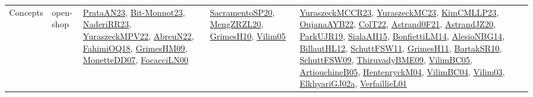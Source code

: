 {\begin{longtable}{lp{3cm}>{\raggedright}p{6cm}>{\raggedright}p{6cm}p{8cm}}
Concepts & open-shop & \href{articles/PrataAN23.pdf}{PrataAN23}\cite{PrataAN23}, \href{papers/Bit-Monnot23.pdf}{Bit-Monnot23}\cite{Bit-Monnot23}, \href{articles/NaderiRR23.pdf}{NaderiRR23}\cite{NaderiRR23}, \href{articles/YuraszeckMPV22.pdf}{YuraszeckMPV22}\cite{YuraszeckMPV22}, \href{articles/AbreuN22.pdf}{AbreuN22}\cite{AbreuN22}, \href{articles/FahimiOQ18.pdf}{FahimiOQ18}\cite{FahimiOQ18}, \href{papers/GrimesHM09.pdf}{GrimesHM09}\cite{GrimesHM09}, \href{papers/MonetteDD07.pdf}{MonetteDD07}\cite{MonetteDD07}, \href{papers/FocacciLN00.pdf}{FocacciLN00}\cite{FocacciLN00} & \href{articles/SacramentoSP20.pdf}{SacramentoSP20}\cite{SacramentoSP20}, \href{articles/MengZRZL20.pdf}{MengZRZL20}\cite{MengZRZL20}, \href{papers/GrimesH10.pdf}{GrimesH10}\cite{GrimesH10}, \href{papers/Vilim05.pdf}{Vilim05}\cite{Vilim05} & \href{articles/YuraszeckMCCR23.pdf}{YuraszeckMCCR23}\cite{YuraszeckMCCR23}, \href{papers/YuraszeckMC23.pdf}{YuraszeckMC23}\cite{YuraszeckMC23}, \href{papers/KimCMLLP23.pdf}{KimCMLLP23}\cite{KimCMLLP23}, \href{papers/OujanaAYB22.pdf}{OujanaAYB22}\cite{OujanaAYB22}, \href{articles/ColT22.pdf}{ColT22}\cite{ColT22}, \href{papers/Astrand0F21.pdf}{Astrand0F21}\cite{Astrand0F21}, \href{articles/AstrandJZ20.pdf}{AstrandJZ20}\cite{AstrandJZ20}, \href{papers/ParkUJR19.pdf}{ParkUJR19}\cite{ParkUJR19}, \href{papers/SialaAH15.pdf}{SialaAH15}\cite{SialaAH15}, \href{papers/BonfiettiLM14.pdf}{BonfiettiLM14}\cite{BonfiettiLM14}, \href{papers/AlesioNBG14.pdf}{AlesioNBG14}\cite{AlesioNBG14}, \href{papers/BillautHL12.pdf}{BillautHL12}\cite{BillautHL12}, \href{articles/SchuttFSW11.pdf}{SchuttFSW11}\cite{SchuttFSW11}, \href{papers/GrimesH11.pdf}{GrimesH11}\cite{GrimesH11}, \href{articles/BartakSR10.pdf}{BartakSR10}\cite{BartakSR10}, \href{papers/SchuttFSW09.pdf}{SchuttFSW09}\cite{SchuttFSW09}, \href{papers/ThiruvadyBME09.pdf}{ThiruvadyBME09}\cite{ThiruvadyBME09}, \href{articles/VilimBC05.pdf}{VilimBC05}\cite{VilimBC05}, \href{papers/ArtiouchineB05.pdf}{ArtiouchineB05}\cite{ArtiouchineB05}, \href{papers/HentenryckM04.pdf}{HentenryckM04}\cite{HentenryckM04}, \href{papers/VilimBC04.pdf}{VilimBC04}\cite{VilimBC04}, \href{papers/Vilim03.pdf}{Vilim03}\cite{Vilim03}, \href{papers/ElkhyariGJ02a.pdf}{ElkhyariGJ02a}\cite{ElkhyariGJ02a}, \href{papers/VerfaillieL01.pdf}{VerfaillieL01}\cite{VerfaillieL01}\\

\end{longtable}}
